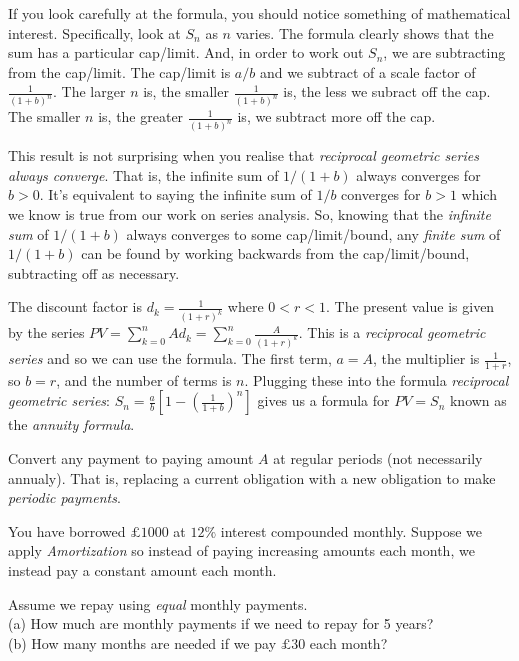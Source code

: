 If you look carefully at the formula, you should notice something of mathematical interest. 
Specifically, look at $S_n$ as $n$ varies. The formula clearly shows that the sum 
has a particular cap/limit. And, in order to work out $S_n$, we are subtracting from 
the cap/limit. The cap/limit is $a/b$ and we subtract of a scale factor of $\frac{1}{(1+b)^n}$. 
The larger $n$ is, the smaller $\frac{1}{(1+b)^n}$ is, the less we subract off the cap. 
The smaller $n$ is, the greater $\frac{1}{(1+b)^n}$ is, we subtract more off the cap. 

This result is not surprising when you realise that \textit{reciprocal geometric series} 
\textit{always converge}. That is, the infinite sum of 
$1/(1+b)$ always converges for $b > 0$. It's equivalent to saying 
the infinite sum of $1/b$ converges for $b > 1$ which we know is true from our work 
on series analysis. So, knowing that the \textit{infinite sum} of $1/(1+b)$ always converges 
to some cap/limit/bound, any \textit{finite sum} of $1/(1+b)$ can be found by 
working backwards from the cap/limit/bound, subtracting off as necessary. 




\frmrule


The discount factor is $d_k = \frac{1}{(1+r)^k}$ where $0 < r < 1$. 
The present value is given by the series $PV = \sum^{n}_{k = 0} A d_k = \sum^{n}_{k = 0} \frac{A}{(1+r)^k}$. 
This is a \textit{reciprocal geometric series} and so we can use the formula. 
The first term, $a = A$, the multiplier is $\frac{1}{1+r}$, so $b = r$, and 
the number of terms is $n$. Plugging these into the formula 
\textit{reciprocal geometric series}: 
$S_n = \frac{a}{b}\left[ 1 - \left(\frac{1}{1+b}\right)^{n} \right]$ 
gives us a formula for $PV = S_n$ known as the \textit{annuity formula}. 




Convert any payment to paying amount $A$ at regular periods (not necessarily annualy). 
That is, replacing a current obligation with a new obligation to make \textit{periodic payments}. 



\frmrule

\begin{example}
You have borrowed $\pounds 1000$ at $12\%$ interest compounded monthly.
Suppose we apply \textit{Amortization} so instead of paying 
increasing amounts each month, we instead pay a constant amount each month.

Assume we repay using \textit{equal} monthly payments.\\
(a) How much are monthly payments if we need to repay for 5 years? \\
(b) How many months are needed if we pay $\pounds 30$ each month? \\
\end{example}